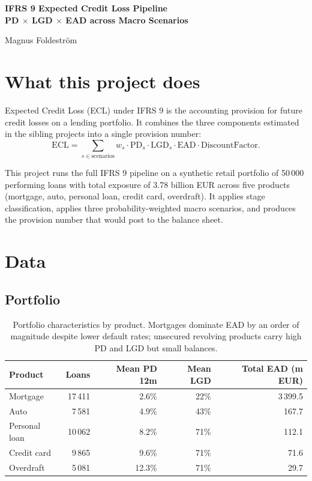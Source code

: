 \documentclass[a4paper,11pt]{article}
\begin{document}
\begin{titlepage}
\thispagestyle{empty}
\centering
\vspace*{3cm}
{\Huge\bfseries IFRS 9 Expected Credit Loss Pipeline\\\bigskip
\LARGE PD $\times$ LGD $\times$ EAD across Macro Scenarios
\par}
\vspace{1.5cm}
{\Large Magnus Foldeström\par}
\vfill
\end{titlepage}

\section{What this project does}

Expected Credit Loss (ECL) under IFRS 9 is the accounting provision
for future credit losses on a lending portfolio. It combines the
three components estimated in the sibling projects into a single
provision number:
$$\mathrm{ECL} = \sum_{s \in \mathrm{scenarios}} w_s \cdot \mathrm{PD}_s \cdot \mathrm{LGD}_s \cdot \mathrm{EAD} \cdot \mathrm{DiscountFactor}.$$

This project runs the full IFRS 9 pipeline on a synthetic retail
portfolio of 50\,000 performing loans with total exposure of 3.78
billion EUR across five products (mortgage, auto, personal loan,
credit card, overdraft). It applies stage classification, applies
three probability-weighted macro scenarios, and produces the
provision number that would post to the balance sheet.

\section{Data}

\subsection{Portfolio}

\begin{table}[H]
\centering
\begin{tabular}{l r r r r}
\toprule
\textbf{Product} & \textbf{Loans} & \textbf{Mean PD 12m} & \textbf{Mean LGD} & \textbf{Total EAD (m EUR)} \\
\midrule
Mortgage       & 17\,411 & 2.6\%  & 22\% & 3\,399.5 \\
Auto           & 7\,581  & 4.9\%  & 43\% & 167.7 \\
Personal loan  & 10\,062 & 8.2\%  & 71\% & 112.1 \\
Credit card    & 9\,865  & 9.6\%  & 71\% & 71.6 \\
Overdraft      & 5\,081  & 12.3\% & 71\% & 29.7 \\
\bottomrule
\end{tabular}
\caption{Portfolio characteristics by product. Mortgages dominate EAD
by an order of magnitude despite lower default rates; unsecured
revolving products carry high PD and LGD but small balances.}
\end{table}
\end{document}

